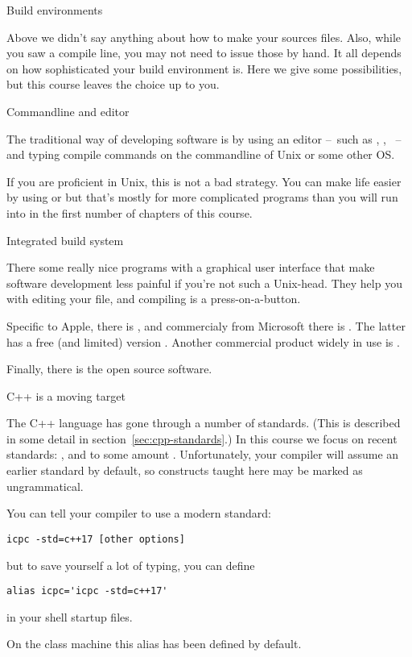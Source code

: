  {Build environments}

Above we didn't say anything about how to make your sources files.
Also, while you saw a compile line, you may not need to issue those by hand.
It all depends on how sophisticated your build environment is.
Here we give some possibilities,
but this course leaves the choice up to you.

 {Commandline and editor}

The traditional way of developing software is by using an editor
--~such as , , ~--
and typing compile commands on the commandline of Unix
or some other \acf{OS}.

If you are proficient in Unix, this is not a bad strategy.
You can make life easier by using  or 
but that's mostly for more complicated programs than you will
run into in the first number of chapters of this course.

 {Integrated build system}

There some really nice programs with a graphical user interface
that make software development less painful
if you're not such a Unix-head.
They help you with editing your file,
and compiling is a press-on-a-button.

Specific to Apple, there is ,
and commercialy from Microsoft there is .
The latter has a free (and limited) version .
Another commercial product widely in use is .

Finally, there is the open source  software.

 {C++ is a moving target}

The C++ language has gone through a number of standards. (This is
described in some detail in section~\ref{sec:cpp-standards}.) In this
course we focus on recent standards: 
, and to some amount .
Unfortunately, your compiler will assume an earlier standard by default,
so constructs taught here may be marked as ungrammatical.

You can tell your compiler to use a modern standard:
\begin{verbatim}
icpc -std=c++17 [other options]
\end{verbatim}
but to save yourself a lot of typing, you can define
\begin{verbatim}
alias icpc='icpc -std=c++17'
\end{verbatim}
in your shell startup files.
\begin{tacc}
On the class  machine this alias has been defined by default.
\end{tacc}

